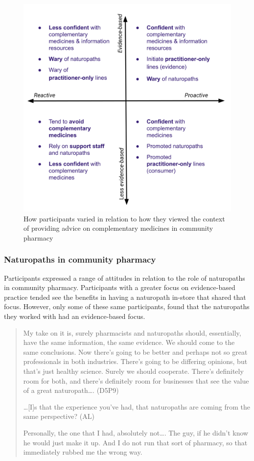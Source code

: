 \documentclass[11pt,a4paper]{article}
\begin{document}
\begin{figure}
\centering
\includegraphics{files/CMEthics_context2.png}
\caption{How participants varied in relation to how they viewed the
context of providing advice on complementary medicines in community
pharmacy \label{fig_context2}}
\end{figure}

\subsubsection{Naturopaths in community
pharmacy}\label{naturopaths-in-community-pharmacy}

Participants expressed a range of attitudes in relation to the role of
naturopaths in community pharmacy. Participants with a greater focus on
evidence-based practice tended see the benefits in having a naturopath
in-store that shared that focus. However, only some of these same
participants, found that the naturopaths they worked with had an
evidence-based focus.

\begin{quote}
My take on it is, surely pharmacists and naturopaths should,
essentially, have the same information, the same evidence. We should
come to the same conclusions. Now there's going to be better and perhaps
not so great professionals in both industries. There's going to be
differing opinions, but that's just healthy science. Surely we should
cooperate. There's definitely room for both, and there's definitely room
for businesses that see the value of a great naturopath\ldots{}. (D5P9)

\ldots{}{[}I{]}s that the experience you've had, that naturopaths are
coming from the same perspective? (AL)

Personally, the one that I had, absolutely not\ldots{}. The guy, if he
didn't know he would just make it up. And I do not run that sort of
pharmacy, so that immediately rubbed me the wrong way.
\end{quote}
\end{document}

